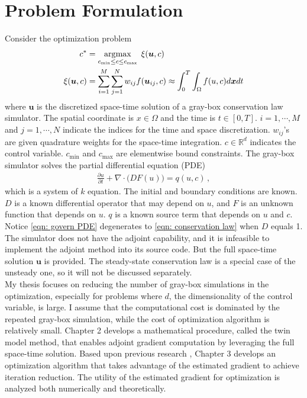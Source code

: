\section{Problem Formulation}
\label{sec: formulation}
Consider the optimization problem
\begin{equation}\begin{split}
    c^* &= \argmax_{c_{\min}\le  c \le c_{\max}}\; \xi(\boldsymbol{u},c) \\
    \xi(\boldsymbol{u},c) &= \sum_{i=1}^M \sum_{j=1}^N w_{ij} f(\boldsymbol{u}_{ij},c)
    \approx \int_0^T \int_\Omega f(u,c) d\boldsymbol{x} d t%
    \label{eqn: objective prototype}
\end{split}\end{equation}
where $\boldsymbol{u}$ is the discretized space-time solution of a gray-box conservation law
simulator. The spatial coordinate is $x \in \Omega$ and the time is $t\in[0,T]$.
$i=1,\cdots, M$ and $j=1,\cdots, N$ indicate the indices for the time and space discretization.
$w_{ij}$'s are given quadrature weights for the space-time integration.
$c\in\mathbb{R}^d$ indicates the control variable. 
$c_{\min}$ and $c_{\max}$ are elementwise bound constraints.
The gray-box simulator solves the partial differential equation (PDE)
\begin{equation}\begin{split}
    \frac{\partial u}{\partial t}+ \nabla \cdot \big( D F(u) \big) = q(u,c)\,,
\end{split}
\label{eqn: govern PDE}
\end{equation}
which is a system of $k$ equation. 
The initial and boundary conditions are known.
$D$ is a known differential operator that may depend on $u$, and
$F$ is an unknown function that depends on $u$.
$q$ is a known source term that depends on $u$ and $c$.
Notice \eqref{eqn: govern PDE} degenerates to \eqref{eqn: conservation law} when $D$ equals 1.
The simulator does not have the adjoint capability,
and it is infeasible to implement the adjoint method into its source code. But the full space-time solution 
$\boldsymbol{u}$ is provided. The steady-state conservation law is a special case
of the unsteady one, so it will not be discussed separately.\\

My thesis focuses on reducing the number of gray-box simulations in the optimization,
especially for problems where $d$, the dimensionality of the control variable,
is large. I assume that the computational cost
is dominated by the repeated gray-box simulation, while the cost of optimization algorithm 
is relatively small. Chapter 2 develops a mathematical procedure, called the twin model method, 
that enables adjoint gradient computation by leveraging the full space-time solution.
Based upon previous research \cite{derivative RKHS, convergen EI, practical Bayesian, review EI, grad coKriging, KennedyOhagan1, KennedyOhagan2}, 
Chapter 3 develops an optimization algorithm that takes 
advantage of the estimated gradient to achieve iteration reduction. The utility of
the estimated gradient for optimization is analyzed both numerically and theoretically.

